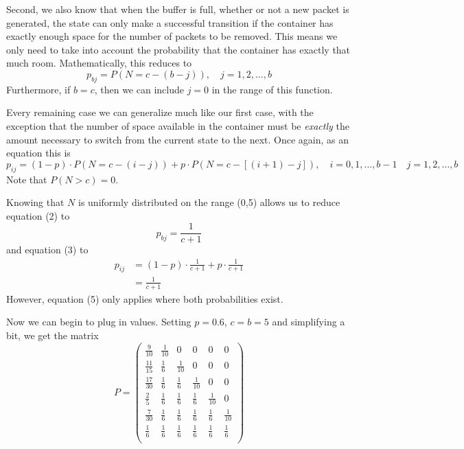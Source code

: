 \documentclass{article}
\begin{document}
Second, we also know that when the buffer is full, whether or not a new packet
is generated, the state can only make a successful transition if the container
has exactly enough space for the number of packets to be removed. This means we
only need to take into account the probability that the container has exactly
that much room. Mathematically, this reduces to
\begin{equation}
  p_{bj} = P( N = c - (b - j) ), \quad j = 1,2,\ldots,b
\end{equation}
Furthermore, if $b = c$, then we can include $j = 0$ in the range of this
function.

Every remaining case we can generalize much like our first case, with the
exception that the number of space available in the container must be
\emph{exactly} the amount necessary to switch from the current state to the
next. Once again, as an equation this is
\begin{equation}
  p_{ij} = (1 - p)\cdot P( N = c - (i - j) ) + p\cdot P( N = c - [(i + 1) - j]
  ), \quad i=0,1,\ldots,b-1 \quad j=1,2,\ldots,b
\end{equation}
Note that $P( N > c ) = 0$.

Knowing that $N$ is uniformly distributed on the range (0,5) allows us to
reduce equation (2) to
\begin{equation}
  p_{bj} = \frac{1}{c + 1}
\end{equation}
and equation (3) to
\begin{align}
  p_{ij} &= (1 - p)\cdot\frac{1}{c + 1} + p\cdot\frac{1}{c + 1} \nonumber \\
         &= \frac{1}{c + 1}
\end{align}
However, equation (5) only applies where both probabilities exist.

Now we can begin to plug in values. Setting $p = 0.6$, $c = b = 5$ and
simplifying a bit, we get the matrix
\[
  P =
\begin{pmatrix}
  \frac{9}{10} & \frac{1}{10} & 0 & 0 & 0 & 0 \\[6pt]
  \frac{11}{15} & \frac{1}{6} & \frac{1}{10} & 0 & 0 & 0 \\[6pt]
  \frac{17}{30} & \frac{1}{6} & \frac{1}{6} & \frac{1}{10} & 0 & 0 \\[6pt]
  \frac{2}{5} & \frac{1}{6} & \frac{1}{6} & \frac{1}{6} & \frac{1}{10} & 0
  \\[6pt]
  \frac{7}{30} & \frac{1}{6} & \frac{1}{6} & \frac{1}{6} & \frac{1}{6} &
  \frac{1}{10} \\[6pt]
  \frac{1}{6} & \frac{1}{6} & \frac{1}{6} & \frac{1}{6} & \frac{1}{6} &
  \frac{1}{6} \\[6pt]
\end{pmatrix}
\]
\end{document}
